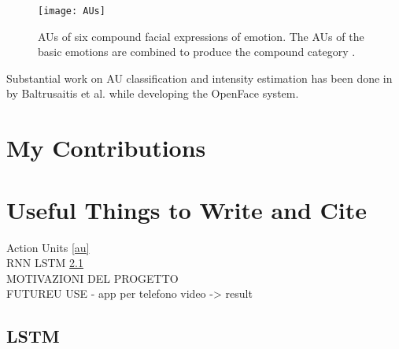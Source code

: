 \begin{figure}[H]
	\centering
	\texttt{[image: AUs]}
	\caption{AUs of six compound facial expressions of emotion. The AUs of the basic emotions are combined to produce the compound category \cite{Du2014CompoundFE}.}
	\label{fig:AUs}
\end{figure}

Substantial work on AU classification and intensity estimation has been done in \cite{Baltru2015} by Baltrusaitis et al. while developing the OpenFace \cite{Baltru2016} system. 


\pagebreak



\section{My Contributions} \label{contrib}


\section{Useful Things to Write and Cite}
Action Units \ref{au} \\
RNN LSTM \ref{lstm} \\
MOTIVAZIONI DEL PROGETTO\\
FUTUREU USE - app per telefono video -> result



\pagebreak

\subsection{LSTM} \label{lstm}